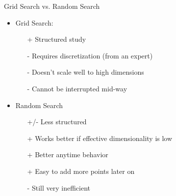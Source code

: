 \documentclass[aspectratio=169]{../latex_main/tntbeamer}  %
\begin{document}
\begin{frame}[c]{Grid Search vs. Random Search}
	
\begin{itemize}
    \item Grid Search:
    \begin{itemize}
        \item[+] Structured study
        \item[-] Requires discretization (from an expert)
        \item[-] Doesn't scale well to high dimensions
        \item[-] Cannot be interrupted mid-way
    \end{itemize}
    \item Random Search
    \begin{itemize}
        \item[+/-] Less structured
        \item[+] Works better if effective dimensionality is low 
        \item[+] Better anytime behavior
        \item[+] Easy to add more points later on
        \item[-] Still very inefficient
    \end{itemize}
\end{itemize}
\end{frame}
\end{document}
